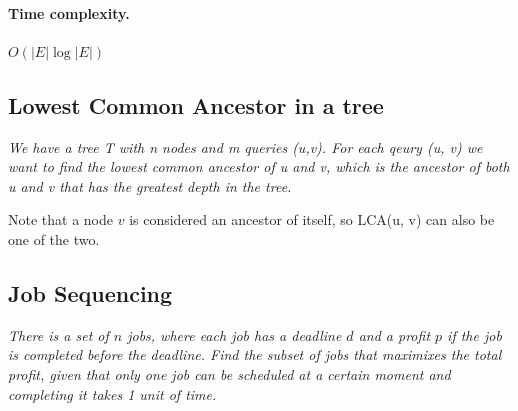 \documentclass{article}
\begin{document}
\paragraph{Time complexity.} $O(|E|\log|E|)$


\subsection{Lowest Common Ancestor in a tree}
\emph{We have a tree T with  n nodes and m queries (u,v). For each qeury (u, v) we want to find
the lowest common ancestor of u and v, which is the ancestor of both u and v that has the greatest depth in the tree.
}

 \bigskip
 Note that a node $v$ is considered an ancestor of itself, so LCA(u, v) can also be one of the two.


\subsection{Job Sequencing}
\emph{There is a set of $n$ jobs, where each job has a deadline $d$ and a profit $p$ if the job
is completed before the deadline. Find the subset of jobs that maximixes the total profit, given
that only one job can be scheduled at a certain moment and completing it takes 1 unit of time.}



\end{document}
